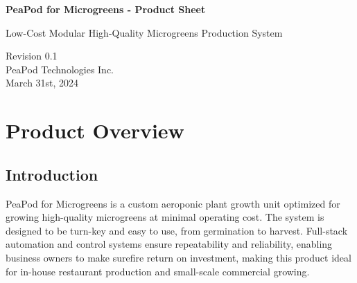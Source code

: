 \documentclass{../../../docs/tex/report}
\begin{document}
\begin{titlepage}
    \begin{center}
        \vspace*{1.2cm}

        \textbf{\large{PeaPod for Microgreens - Product Sheet}}

        \vspace{0.5cm}

        Low-Cost Modular High-Quality Microgreens Production System

        \vfill
        
        \vspace{1.25cm}

        Revision 0.1\\
        PeaPod Technologies Inc.\\
        March 31st, 2024

    \end{center}
\end{titlepage}

\thispagestyle{plain}

\tableofcontents
\clearpage

\section{Product Overview}

\subsection{Introduction}

PeaPod for Microgreens is a custom aeroponic plant growth unit optimized for growing high-quality microgreens at minimal operating cost. The system is designed to be turn-key and easy to use, from germination to harvest. Full-stack automation and control systems ensure repeatability and reliability, enabling business owners to make surefire return on investment, making this product ideal for in-house restaurant production and small-scale commercial growing.

\clearpage



\end{document}
